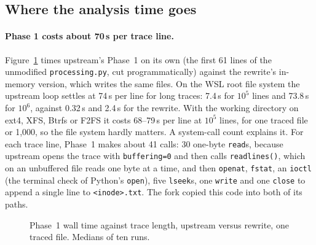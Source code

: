 \subsection{Where the analysis time goes}
\label{sec:anatomy}

\paragraph{Phase 1 costs about 70\,\textmu s per trace line.}
Figure~\ref{fig:phase1} times upstream's Phase~1 on its own (the first 61 lines of the
unmodified \texttt{processing.py}, cut programmatically) against the rewrite's
in-memory version, which writes the same files. On the WSL root file system the
upstream loop settles at 74\,\textmu s per line for long traces: 7.4\,s for
$10^5$ lines and 73.8\,s for $10^6$, against 0.32\,s and 2.4\,s for the rewrite. With
the working directory on ext4, XFS, Btrfs or F2FS it costs 68--79\,\textmu s per line
at $10^5$ lines, for one traced file or 1{,}000, so the file system hardly matters. A
system-call count explains it. For each trace line, Phase~1 makes about 41 calls: 30
one-byte \texttt{read}s, because upstream opens the trace with \texttt{buffering=0}
and then calls \texttt{readlines()}, which on an unbuffered file reads one byte at a
time, and then \texttt{openat}, \texttt{fstat}, an \texttt{ioctl} (the terminal check
of Python's \texttt{open}), five \texttt{lseek}s, one \texttt{write} and one
\texttt{close} to append a single line to \texttt{<inode>.txt}. The fork copied this
code into both of its paths.

\begin{figure}[t]
\centering
{}
\caption{Phase~1 wall time against trace length, upstream versus rewrite, one traced
file. Medians of ten runs.}
\label{fig:phase1}
\end{figure}

